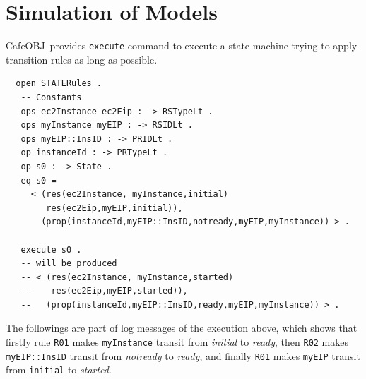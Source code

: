 \documentclass[12pt]{report}
\newcommand{\cafeobj}{{\sf CafeOBJ}~}
\begin{document}
\section{Simulation of Models}
\label{sec:simulation}
\cafeobj provides {\tt execute} command to execute a state machine
trying to apply transition rules as long as possible.
\small
\begin{verbatim}
  open STATERules .
   -- Constants
   ops ec2Instance ec2Eip : -> RSTypeLt .
   ops myInstance myEIP : -> RSIDLt .
   ops myEIP::InsID : -> PRIDLt .
   op instanceId : -> PRTypeLt .
   op s0 : -> State .
   eq s0 =
     < (res(ec2Instance, myInstance,initial)
        res(ec2Eip,myEIP,initial)),
       (prop(instanceId,myEIP::InsID,notready,myEIP,myInstance)) > .
        
   execute s0 . 
   -- will be produced 
   -- < (res(ec2Instance, myInstance,started)
   --    res(ec2Eip,myEIP,started)),
   --   (prop(instanceId,myEIP::InsID,ready,myEIP,myInstance)) > .
\end{verbatim}
\normalsize
The followings are part of log messages of the execution above, which
shows that firstly rule {\tt R01} makes {\tt myInstance} transit
from {\it initial} to {\it ready}, then {\tt R02} makes
{\tt myEIP::InsID} transit from {\it notready} to {\it ready}, and
finally {\tt R01} makes {\tt myEIP} transit from {\tt initial} to
{\it started}.
\small
\end{document}
